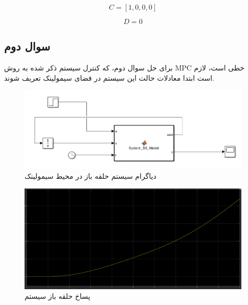 \[
C = \left[1, 0, 0, 0\right]
\]

\[
D = 0
\]
\subsection*{سوال دوم}
برای حل سوال دوم، که کنترل سیستم ذکر شده به روش MPC خطی است، لازم است ابتدا معادلات حالت این سیستم در فضای سیمولینک تعریف شوند. 
\begin{figure}[H]
	\centering
	\includegraphics[width=0.7\linewidth]{../img/Q1_OL_diagram}
	\caption{دیاگرام سیستم حلقه باز در محیط سیمولینک}
	\label{fig:q1oldiagram}
\end{figure}
\begin{figure}[H]
	\centering
	\includegraphics[width=0.7\linewidth]{../img/Q1_OL}
	\caption{پساخ حلقه باز سیستم}
	\label{fig:q1ol}
\end{figure}


